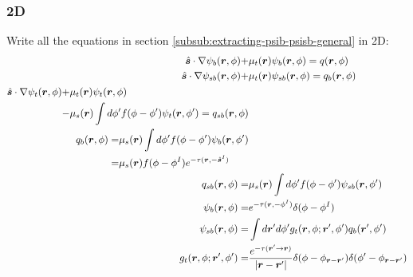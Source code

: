 \documentclass [10pt,letterpaper]{article}
\newcommand{\unitvectorsym}[1]{\hat{\vectorsym{#1}}}
\newcommand{\grad}{\nabla}
\begin{document}
\subsubsection{2D}
\label{subsub:extracting-psib-psisb-2d}
Write all the equations in section \ref{subsub:extracting-psib-psisb-general} in 2D:
\begin{subequations} \label{eq:def-psi-2ndtime-psisb-psit-2d-qb-2ndtime-qsb-2d}
	\begin{align}
		\unitvectorsym{s} \cdot \grad
		\psi_b(\vectorsym{r},\phi)
		+&
		\mu_t(\vectorsym{r})
		\psi_b(\vectorsym{r},\phi)
		=
		q(\vectorsym{r},\phi) 
		\label{eq:def-psib-2d-2ndtime}
		\\ 
		\unitvectorsym{s} \cdot \grad
		\psi_{sb}(\vectorsym{r},\phi)
		+&
		\mu_t(\vectorsym{r})
		\psi_{sb}(\vectorsym{r},\phi)
		=
		q_b(\vectorsym{r},\phi) 
		\label{eq:def-psisb-2d}
		\\
		\begin{split}
			\unitvectorsym{s} \cdot \grad
			\psi_t(\vectorsym{r},\phi)
			+&
			\mu_t(\vectorsym{r})
			\psi_t(\vectorsym{r},\phi)
			\\
			-&
			\mu_s(\vectorsym{r})
			\int d\phi^\prime
			f(\phi - \phi^\prime)
			\psi_t(\vectorsym{r},\phi^\prime)
			=
			q_{sb}(\vectorsym{r},\phi) 
		\end{split}
		\label{eq:def-psit-2d} 
		\\
		\begin{split}
			q_b(\vectorsym{r},\phi)
			=&
			\mu_s(\vectorsym{r})
			\int d\phi^\prime
			f(\phi - \phi^\prime)
			\psi_b(\vectorsym{r},\phi^\prime)
			\\
			=&
			\mu_s(\vectorsym{r})
			f(\phi-\phi^I)
			e^{-\tau(\vectorsym{r},-\unitvectorsym{s}^I)} 
		\end{split}
		\label{eq:result-qb-2d-2ndtime}
		\\ 
		q_{sb}(\vectorsym{r},\phi)
		=&
		\mu_s(\vectorsym{r})
		\int d\phi^\prime
		f(\phi - \phi^\prime)
		\psi_{sb}(\vectorsym{r},\phi^\prime)
		\label{eq:def-qsb-2d}
		\\
		\psi_b(\vectorsym{r},\phi)
		=&
		e^{-\tau(\vectorsym{r},-\phi^I)}
		\delta(\phi-\phi^I)
		\label{eq:result-psib-2d-2ndtime} 
		\\
		\psi_{sb}(\vectorsym{r},\phi)
		=&
		\int d\vectorsym{r}^\prime d\phi^\prime
		g_t(\vectorsym{r},\phi;\vectorsym{r}^\prime,\phi^\prime) 
		q_b(\vectorsym{r}^\prime,\phi^\prime) 
		\label{eq:der-psisb-2d} 
		\\
		g_t(\vectorsym{r},\phi;\vectorsym{r}^\prime,\phi^\prime)
		=&
		\frac
		{e^{-\tau(\vectorsym{r}^\prime\to\vectorsym{r})}}
		{\lvert \vectorsym{r}-\vectorsym{r}^\prime \rvert}
		\delta(\phi-\phi_{\vectorsym{r}-\vectorsym{r}^\prime})
		\delta(\phi^\prime-\phi_{\vectorsym{r}-\vectorsym{r}^\prime})
		\label{eq:exp-gft-2d-2ndtime} 
	\end{align}
\end{subequations}
\end{document}
